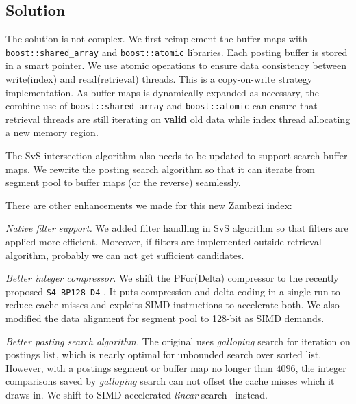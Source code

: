 \subsection{Solution}

The solution is not complex. We first reimplement the buffer maps with \texttt{boost::shared\_array} and \texttt{boost::atomic} libraries. Each posting buffer is stored in a smart pointer. We use atomic operations to ensure data consistency between write(index) and read(retrieval) threads. This is a copy-on-write strategy implementation. As buffer maps is dynamically expanded as necessary, the combine use of \texttt{boost::shared\_array} and \texttt{boost::atomic} can ensure that retrieval threads are still iterating on \textbf{valid} old data while index thread allocating a new memory region.

The SvS intersection algorithm also needs to be updated to support search buffer maps. We rewrite the posting search algorithm so that it can iterate from segment pool to buffer maps (or the reverse) seamlessly.

There are other enhancements we made for this new Zambezi index:

\begin{list}{}{\leftmargin=1em}
\setlength{\itemsep}{-2pt}

  \item \textit{Native filter support.} We added filter handling in SvS algorithm so that filters are applied more efficient. Moreover, if filters are implemented outside retrieval algorithm, probably we can not get sufficient candidates.

  \item \textit{Better integer compressor.} We shift the PFor(Delta) compressor to the recently proposed \texttt{S4-BP128-D4} \cite{Lemire_etal_2014}. It puts compression and delta coding in a single run to reduce cache misses and exploits SIMD instructions to accelerate both. We also modified the data alignment for segment pool to 128-bit as SIMD demands.

  \item \textit{Better posting search algorithm.} The original uses \textit{galloping} search \cite{bentley1976almost} for iteration on postings list, which is nearly optimal for unbounded search over sorted list. However, with a postings segment or buffer map no longer than $4096$, the integer comparisons saved by \textit{galloping} search can not offset the cache misses which it draws in. We shift to SIMD accelerated \textit{linear} search~\cite{schani2010} instead.
\end{list}
